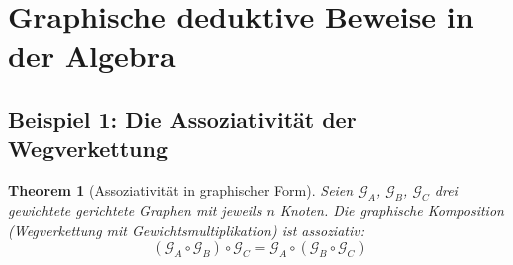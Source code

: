 \documentclass[12pt, a4paper]{article}
\newtheorem{theorem}{Theorem}[section]
\theoremstyle{definition}
\theoremstyle{remark}
\newcommand{\Graph}{\mathcal{G}}
\begin{document}
\section{Graphische deduktive Beweise in der Algebra}
\label{sec:graphische_beweise}

\subsection{Beispiel 1: Die Assoziativität der Wegverkettung}
\label{subsec:beispiel_assoziativitaet}

\begin{theorem}[Assoziativität in graphischer Form]
\label{thm:graph_assoziativitaet}
Seien $\Graph_A$, $\Graph_B$, $\Graph_C$ drei gewichtete gerichtete Graphen mit jeweils $n$ Knoten. Die graphische Komposition (Wegverkettung mit Gewichtsmultiplikation) ist assoziativ:
\[
  (\Graph_A \circ \Graph_B) \circ \Graph_C = \Graph_A \circ (\Graph_B \circ \Graph_C)
\]
\end{theorem}
\end{document}
